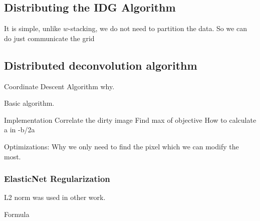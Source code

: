 \subsection{Distributing the IDG Algorithm}\label{distribution:idg}
It is simple, unlike $w$-stacking, we do not need to partition the data. So we can do just communicate the grid



\subsection{Distributed deconvolution algorithm}

Coordinate Descent Algorithm why.

Basic algorithm.


Implementation
Correlate the dirty image
Find max of objective
How to calculate a in -b/2a

Optimizations:
Why we only need to find the pixel which we can modify the most.

\subsubsection{ElasticNet Regularization}
L2 norm was used in other work. \cite{Ferrari}


Formula

